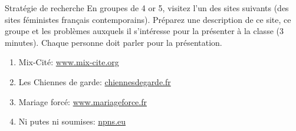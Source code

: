 \begin{frame}{Stratégie de recherche}
  En groupes de 4 or 5, visitez l'un des sites suivants (des sites féministes français contemporains).
  Préparez une description de ce site, ce groupe et les problèmes auxquels il s'intéresse pour la présenter à la classe (3 minutes).
  Chaque personne doit parler pour la présentation.
  \begin{enumerate}
    \item Mix-Cité: \href{https://www.mix-cite.org}{www.mix-cite.org}
    \item Les Chiennes de garde: \href{https://chiennesdegarde.fr}{chiennesdegarde.fr}
    \item Mariage forcé: \href{https://www.mariageforce.fr}{www.mariageforce.fr}
    \item Ni putes ni soumises: \href{https://npns.eu/}{npns.eu}
  \end{enumerate}
\end{frame}